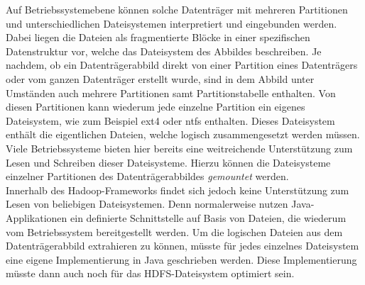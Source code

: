 \noindent
Auf Betriebssystemebene können solche Datenträger mit mehreren Partitionen und unterschiedlichen Dateisystemen interpretiert und eingebunden werden. Dabei liegen die Dateien als fragmentierte Blöcke in einer spezifischen Datenstruktur vor, welche das Dateisystem des Abbildes beschreiben. Je nachdem, ob ein Datenträgerabbild direkt von einer Partition eines Datenträgers oder vom ganzen Datenträger erstellt wurde, sind in dem Abbild unter Umständen auch mehrere Partitionen samt Partitionstabelle enthalten. 
Von diesen Partitionen kann wiederum jede einzelne Partition ein eigenes Dateisystem, wie zum Beispiel ext4 oder \acrshort{ntfs} enthalten. Dieses Dateisystem enthält die eigentlichen Dateien, welche logisch zusammengesetzt werden müssen. Viele Betriebssysteme bieten hier bereits eine weitreichende Unterstützung zum Lesen und Schreiben dieser Dateisysteme. Hierzu können die Dateisysteme einzelner Partitionen des Datenträgerabbildes \textit{gemountet} werden.\\

\noindent
Innerhalb des Hadoop-Frameworks findet sich jedoch keine Unterstützung zum Lesen von beliebigen Dateisystemen. Denn normalerweise nutzen Java-Applikationen ein definierte Schnittstelle auf Basis von Dateien, die wiederum vom Betriebssystem bereitgestellt werden. Um die logischen Dateien aus dem Datenträgerabbild extrahieren zu können, müsste für jedes einzelnes Dateisystem eine eigene Implementierung in Java geschrieben werden. Diese Implementierung müsste dann auch noch für das HDFS-Dateisystem optimiert sein.\\ 

